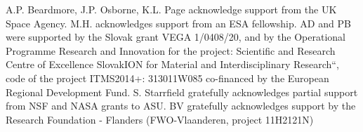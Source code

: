 \documentclass{aa}
\begin{document}
\begin{acknowledgements}
A.P. Beardmore, J.P. Osborne, K.L. Page
acknowledge support from the UK Space Agency.
M.H. acknowledges support from an ESA fellowship.
AD and PB were supported by the Slovak grant VEGA 1/0408/20, and by the Operational Programme Research and Innovation for the project: Scientific and Research Centre of Excellence SlovakION for Material and Interdisciplinary Research“, code of the project ITMS2014+: 313011W085 co-financed by the European Regional Development Fund.
S. Starrfield gratefully acknowledges partial support
from NSF and NASA grants to ASU.
BV gratefully acknowledges support by the Research Foundation - Flanders (FWO-Vlaanderen, project 11H2121N)
\end{acknowledgements}



\end{document}
